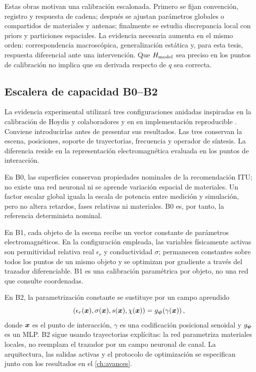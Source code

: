 Estas obras motivan una calibración escalonada. Primero se fijan convención,
registro y respuesta de cadena; después se ajustan parámetros globales o compartidos
de materiales y antenas; finalmente se estudia discrepancia local con priors y
particiones espaciales. La evidencia necesaria aumenta en el mismo orden:
correspondencia macroscópica, generalización estática y, para esta tesis, respuesta
diferencial ante una intervención. Que $H_{\rm model}$ sea preciso en los puntos de
calibración no implica que su derivada respecto de $q$ sea correcta.

\subsection{Escalera de capacidad B0--B2}

La evidencia experimental utilizará tres configuraciones anidadas inspiradas en
la calibración de Hoydis y colaboradores y en su implementación reproducible
\citep{Hoydis2024DiffRT,NVIDIA2023DiffRTCalibration}. Conviene introducirlas antes
de presentar sus resultados. Las tres conservan la escena, posiciones, soporte de
trayectorias, frecuencia y operador de síntesis. La diferencia reside en la
representación electromagnética evaluada en los puntos de interacción.

En B0, las superficies conservan propiedades nominales de la recomendación ITU;
no existe una red neuronal ni se aprende variación espacial de materiales. Un
factor escalar global iguala la escala de potencia entre medición y simulación,
pero no altera retardos, fases relativas ni materiales. B0 es, por tanto, la
referencia determinista nominal.

En B1, cada objeto de la escena recibe un vector constante de parámetros
electromagnéticos. En la configuración empleada, las variables físicamente activas
son permitividad relativa real $\epsilon_r$ y conductividad $\sigma$; permanecen
constantes sobre todos los puntos de un mismo objeto y se optimizan por gradiente a
través del trazador diferenciable. B1 es una calibración paramétrica por objeto,
no una red que consulte coordenadas.

En B2, la parametrización constante se sustituye por un campo aprendido
\begin{equation}
(\epsilon_r(\bm{x}),\sigma(\bm{x}),s(\bm{x}),\chi(\bm{x}))
=g_{\bm{\psi}}\!\left(\gamma(\bm{x})\right),
\label{eq:neural_material_field}
\end{equation}
donde $\bm{x}$ es el punto de interacción, $\gamma$ es una codificación posicional
senoidal y $g_{\bm{\psi}}$ es un \ac{MLP}. B2 sigue usando trayectorias explícitas:
la red parametriza materiales locales, no reemplaza el trazador por un campo
neuronal de canal. La arquitectura, las salidas activas y el protocolo de
optimización se especifican junto con los resultados en el \cref{ch:avances}.

